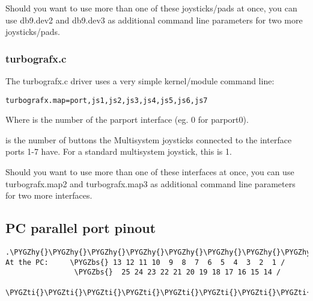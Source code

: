 \documentclass[a4paper,8pt,english]{sphinxmanual}
\def\PYGZbs{\char`\\}
\def\PYGZhy{\char`\-}
\def\PYGZti{\char`\~}
\begin{document}
Should you want to use more than one of these joysticks/pads at once, you
can use db9.dev2 and db9.dev3 as additional command line parameters for two
more joysticks/pads.


\subsubsection{turbografx.c}
\label{input/devices/joystick-parport:turbografx-c}
The turbografx.c driver uses a very simple kernel/module command line:

\begin{Verbatim}[commandchars=\\\{\}]
turbografx.map=port,js1,js2,js3,js4,js5,js6,js7
\end{Verbatim}

Where  is the number of the parport interface (eg. 0 for parport0).

 is the number of buttons the Multisystem joysticks connected to the
interface ports 1-7 have. For a standard multisystem joystick, this is 1.

Should you want to use more than one of these interfaces at once, you can
use turbografx.map2 and turbografx.map3 as additional command line parameters
for two more interfaces.


\subsection{PC parallel port pinout}
\label{input/devices/joystick-parport:pc-parallel-port-pinout}
\begin{Verbatim}[commandchars=\\\{\}]
               .\PYGZhy{}\PYGZhy{}\PYGZhy{}\PYGZhy{}\PYGZhy{}\PYGZhy{}\PYGZhy{}\PYGZhy{}\PYGZhy{}\PYGZhy{}\PYGZhy{}\PYGZhy{}\PYGZhy{}\PYGZhy{}\PYGZhy{}\PYGZhy{}\PYGZhy{}\PYGZhy{}\PYGZhy{}\PYGZhy{}\PYGZhy{}\PYGZhy{}\PYGZhy{}\PYGZhy{}\PYGZhy{}\PYGZhy{}\PYGZhy{}\PYGZhy{}\PYGZhy{}\PYGZhy{}\PYGZhy{}\PYGZhy{}\PYGZhy{}\PYGZhy{}\PYGZhy{}\PYGZhy{}\PYGZhy{}\PYGZhy{}\PYGZhy{}\PYGZhy{}.
At the PC:     \PYGZbs{} 13 12 11 10  9  8  7  6  5  4  3  2  1 /
                \PYGZbs{}  25 24 23 22 21 20 19 18 17 16 15 14 /
                  \PYGZti{}\PYGZti{}\PYGZti{}\PYGZti{}\PYGZti{}\PYGZti{}\PYGZti{}\PYGZti{}\PYGZti{}\PYGZti{}\PYGZti{}\PYGZti{}\PYGZti{}\PYGZti{}\PYGZti{}\PYGZti{}\PYGZti{}\PYGZti{}\PYGZti{}\PYGZti{}\PYGZti{}\PYGZti{}\PYGZti{}\PYGZti{}\PYGZti{}\PYGZti{}\PYGZti{}\PYGZti{}\PYGZti{}\PYGZti{}\PYGZti{}\PYGZti{}\PYGZti{}\PYGZti{}\PYGZti{}\PYGZti{}
\end{Verbatim}
\end{document}
